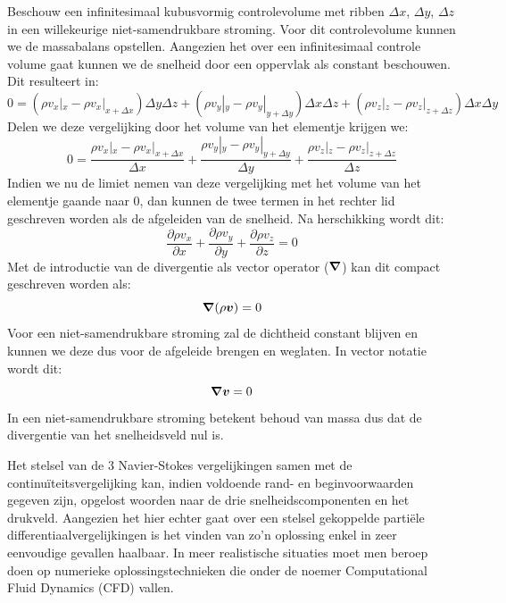 Beschouw een infinitesimaal kubusvormig controlevolume met ribben $\Delta x$, $\Delta y$, $\Delta z$ in een willekeurige niet-samendrukbare stroming. Voor dit controlevolume kunnen we de massabalans opstellen. Aangezien het over een infinitesimaal controle volume gaat kunnen we de snelheid door een oppervlak als constant beschouwen. Dit resulteert in:
\begin{equation}
	0 = (\rho v_x|_{x} - \rho v_x|_{x+\Delta x})\Delta y \Delta z + (\rho v_y|_{y} - \rho v_y|_{y+\Delta y})\Delta x \Delta z + (\rho v_z|_{z} - \rho v_z|_{z+\Delta z})\Delta x \Delta y
\end{equation}
Delen we deze vergelijking door het volume van het elementje krijgen we:
\begin{equation}
	0 = \frac{\rho v_x|_{x} - \rho v_x|_{x+\Delta x}}{\Delta x} + \frac{\rho v_y|_{y} - \rho v_y|_{y+\Delta y}}{\Delta y} + \frac{\rho v_z|_{z} - \rho v_z|_{z+\Delta z}}{\Delta z}
\end{equation}
Indien we nu de limiet nemen van deze vergelijking met het volume van het elementje gaande naar 0, dan kunnen de twee termen in het rechter lid geschreven worden als de afgeleiden van de snelheid. Na herschikking wordt dit:
\begin{equation}
	\frac{\partial \rho v_x}{\partial x} + \frac{\partial \rho v_y}{\partial y} + \frac{\partial \rho v_z}{\partial z} = 0
	\label{eqn:continuiteitsvergelijking}
\end{equation}
Met de introductie van de divergentie als vector operator ($\boldsymbol{\nabla}$) kan dit compact geschreven worden als:
\begin{equation}
	\boldsymbol{\nabla} (\rho\boldsymbol{v}) = 0
\end{equation}
Voor een niet-samendrukbare stroming zal de dichtheid constant blijven en kunnen we deze dus voor de afgeleide brengen en weglaten. In vector notatie wordt dit:
 \begin{equation}
	\boldsymbol{\nabla} \boldsymbol{v} = 0
\end{equation}
In een niet-samendrukbare stroming betekent behoud van massa dus dat de divergentie van het snelheidsveld nul is.

Het stelsel van de 3 Navier-Stokes vergelijkingen samen met de continuïteitsvergelijking kan, indien voldoende rand- en beginvoorwaarden gegeven zijn, opgelost woorden naar de drie snelheidscomponenten en het drukveld. Aangezien het hier echter gaat over een stelsel gekoppelde partiële differentiaalvergelijkingen is het vinden van zo'n oplossing enkel in zeer eenvoudige gevallen haalbaar. In meer realistische situaties moet men beroep doen op numerieke oplossingstechnieken die onder de noemer Computational Fluid Dynamics (CFD) vallen.
